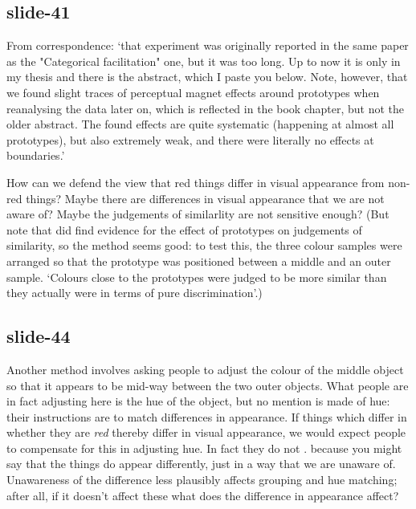 \documentclass[12pt,\papersize]{extarticle}
\begin{document}
\subsection{slide-41}
From correspondence: ‘that experiment was originally reported in the same
paper as the "Categorical facilitation" one, but it was too long. Up to now
it is only in my thesis and there is the abstract, which I paste you below.
Note, however, that we found slight traces of perceptual magnet effects
around prototypes when reanalysing the data later on, which is reflected in
the book chapter, but not the older abstract. The found effects are quite
systematic (happening at almost all prototypes), but also extremely weak,
and there were literally no effects at boundaries.’

How can we defend the view that red things differ in visual appearance from
non-red things? Maybe there are differences in visual appearance that we
are not aware of? Maybe the judgements of similarlity are not sensitive
enough? (But note that \citet{witzel2014category} did find evidence for the
effect of prototypes on judgements of similarity, so the method seems good:
to test this, the three colour samples were arranged so that the prototype
was positioned between a middle and an outer sample. ‘Colours close to the
prototypes were judged to be more similar than they actually were in terms
of pure discrimination’.)

\subsection{slide-44}
Another method involves asking people to adjust the colour of the middle object so that it appears to be mid-way between the two outer objects.
What people  are in fact adjusting here is the hue of the object, but no mention is made of hue: their instructions are to match differences in appearance.
If things which differ in whether they are \emph{red} thereby differ in visual appearance, we would expect people to compensate for this in adjusting hue.
In fact they do not \citep{witzel2014category}.
%
because you might say that the things do appear differently, just in a
way that we are unaware of. Unawareness of the difference less plausibly
affects grouping and hue matching; after all, if it doesn't affect these
what does the difference in appearance affect?
\end{document}
